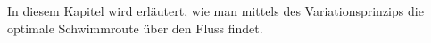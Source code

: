 \begin{refsection}
In diesem Kapitel wird erläutert, wie man mittels des Variationsprinzips die optimale Schwimmroute über den Fluss findet.


	
	
	
	





% 

\printbibliography[heading=subbibliography]
\end{refsection}
